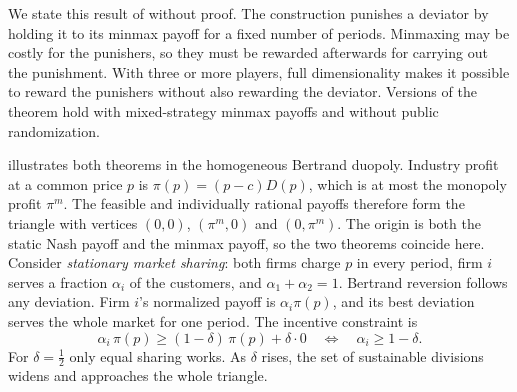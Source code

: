 We state this result of \citet{FudenbergMaskin1986} without proof. The construction punishes a deviator by holding it
to its minmax payoff for a fixed number of periods. Minmaxing may be costly for the punishers, so they must be
rewarded afterwards for carrying out the punishment. With three or more players, full dimensionality makes it
possible to reward the punishers without also rewarding the deviator. Versions of the theorem hold with
mixed-strategy minmax payoffs and without public randomization.

 illustrates both theorems in the homogeneous Bertrand duopoly. Industry profit at a common price
$p$ is $\pi(p) = (p - c)D(p)$, which is at most the monopoly profit $\pi^m$. The feasible and individually rational
payoffs therefore form the triangle with vertices $(0, 0)$, $(\pi^m, 0)$ and $(0, \pi^m)$. The origin is both the
static Nash payoff and the minmax payoff, so the two theorems coincide here. Consider \emph{stationary market
sharing}: both firms charge $p$ in every period, firm $i$ serves a fraction $\alpha_i$ of the customers, and
$\alpha_1 + \alpha_2 = 1$. Bertrand reversion follows any deviation. Firm $i$'s normalized payoff is
$\alpha_i\pi(p)$, and its best deviation serves the whole market for one period. The incentive constraint is
\begin{equation*}
\alpha_i\,\pi(p) \ge (1 - \delta)\,\pi(p) + \delta \cdot 0
\quad\Longleftrightarrow\quad
\alpha_i \ge 1 - \delta .
\end{equation*}
For $\delta = \frac{1}{2}$ only equal sharing works. As $\delta$ rises, the set of sustainable divisions widens and
approaches the whole triangle.

